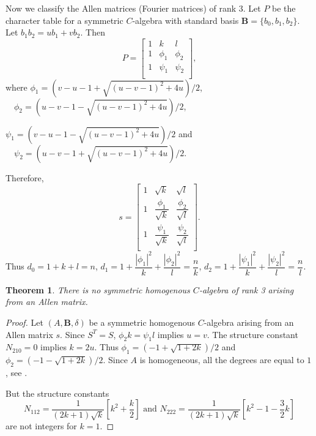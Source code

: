 \documentclass[12pt]{amsart}
\newtheorem{thm}{Theorem}
\begin{document}
\medskip

Now we classify the Allen matrices (Fourier matrices) of rank $3$.
Let $P$ be the character table for a symmetric $C$-algebra with standard basis ${{\mathbf B}}=\{b_0,b_1,b_2\}$. Let $b_1b_2= ub_1+vb_2$.
Then
$$P=\left[
   \begin{array}{ccc}
     1 & k & l \\
     1 & \phi_1 & \phi_2\\
     1 & \psi_1 & \psi_2 \\
   \end{array}
 \right],
$$ where
$\phi_1= ({v-u-1+\sqrt{(u-v-1)^2+4u}})/{2}$,
$\quad \phi_2= ({u-v-1-\sqrt{(u-v-1)^2+4u}})/{2}$,

$\psi_1=({v-u-1-\sqrt{(u-v-1)^2+4u}})/{2}$ and
$\quad \psi_2= ({u-v-1+\sqrt{(u-v-1)^2+4u}})/{2}$.

\noindent Therefore, $$s=\left[
   \begin{array}{ccc}
     1 & \sqrt{k} & \sqrt{l} \\
     1 & \dfrac{\phi_1}{\sqrt{k}} & \dfrac{\phi_2}{\sqrt{l}}\\
     1 & \dfrac{\psi_1}{\sqrt{k}} & \dfrac{\psi_2}{\sqrt{l}} \\
   \end{array}
 \right].
 $$
Thus
$d_0= 1+k+l=n$, $d_1=1+\dfrac{|\phi_1|^2}{k}+\dfrac{|\phi_2|^2}{l}=\dfrac{n}{k}$,
$d_2=1+\dfrac{|\psi_1|^2}{k}+\dfrac{|\psi_2|^2}{l}=\dfrac{n}{l}$.

\begin{thm}\label{t2}
There is no symmetric homogenous $C$-algebra of rank 3 arising from an Allen matrix.
\end{thm}

\begin{proof} Let $(A,{{\mathbf B}}, \delta)$ be a symmetric homogenous $C$-algebra arising from an Allen matrix $s$. Since $S^T=S$, $ \phi_2k= \psi_1l$ implies $u=v$. The structure constant $N_{210}=0$ implies $k=2u$. Thus  $\phi_1=({-1+\sqrt{1+2k}})/{2}$ and $\phi_2=({-1-\sqrt{1+2k}})/{2}$.
Since $A$ is homogeneous, all the degrees are equal to $1$, see \cite[Thorem 25]{G1}.
 
But the structure constants
$$N_{112}=\dfrac{1}{(2k+1)\sqrt{k}}[k^2+ \dfrac{k}{2}] \mbox{ and } N_{222}
=\dfrac{1}{(2k+1)\sqrt{k}}[k^2-1-\dfrac32k]$$
are not integers for $k=1$.
\end{proof}
\end{document}
